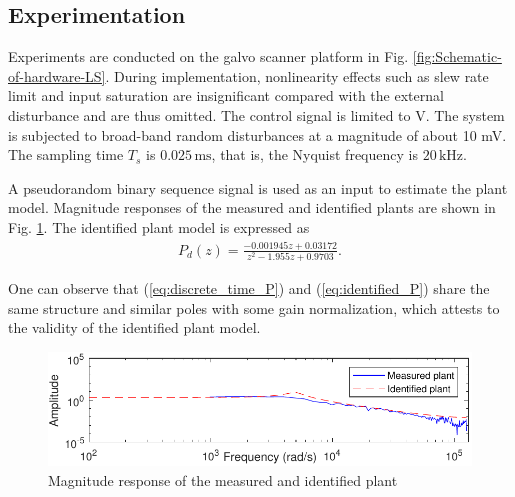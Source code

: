 \documentclass [11pt, proquest] {uwthesis}[2020/02/24]
\begin{document}
\subsection{\label{subsec:Experimentation}Experimentation}

Experiments are conducted on the galvo scanner platform \cite{wang2016spectral}
in Fig. \ref{fig:Schematic-of-hardware-LS}. During implementation,
nonlinearity effects such as slew rate limit and input saturation
are insignificant compared with the external disturbance and are thus
omitted. The control signal is limited to  V. The
system is subjected to broad-band random disturbances at a magnitude
of about 10 mV. The sampling time $T_{s}$ is $0.025\,\text{ms}$,
that is, the Nyquist frequency is $20\,\text{kHz}$. 

A pseudorandom binary sequence signal is used as an input to estimate
the plant model. Magnitude responses of the measured and identified
plants are shown in Fig. \ref{fig:Magnitude-response-of}. The identified
plant model is expressed as
\begin{gather}
P_{d}(z)=\frac{-0.001945z+0.03172}{z^{2}-1.955z+0.9703}.\label{eq:identified_P}
\end{gather}

One can observe that (\ref{eq:discrete_time_P}) and (\ref{eq:identified_P})
share the same structure and similar poles with some gain normalization,
which attests to the validity of the identified plant model. 
\begin{figure}[!ht]
\begin{centering}
\includegraphics[width=13cm]{Loop-shaping/plant_estimation_tf_reduced}
\par\end{centering}
\caption{\label{fig:Magnitude-response-of}Magnitude response of the measured
and identified plant}
\end{figure}
\end{document}
